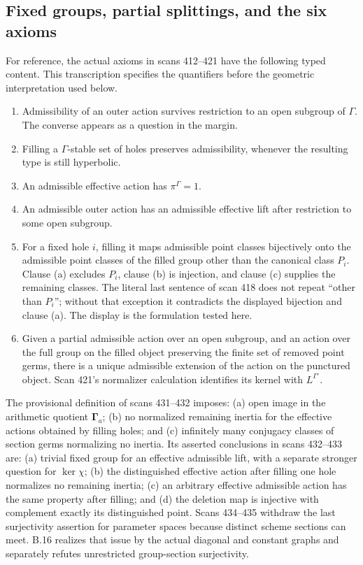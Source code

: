 \subsection{Fixed groups, partial splittings, and the six axioms}

For reference, the actual axioms in scans 412--421 have the following
typed content.  This transcription specifies the quantifiers before
the geometric interpretation used below.
\begin{enumerate}
\item Admissibility of an outer action survives restriction to an open
subgroup of $\Gamma$.  The converse appears as a question in the margin.
\item Filling a $\Gamma$-stable set of holes preserves admissibility,
whenever the resulting type is still hyperbolic.
\item An admissible effective action has $\pi^\Gamma=1$.
\item An admissible outer action has an admissible effective lift
after restriction to some open subgroup.
\item For a fixed hole $i$, filling it maps admissible point classes
bijectively onto the admissible point classes of the filled group
other than the canonical class $P_i$.  Clause (a) excludes $P_i$,
clause (b) is injection, and clause (c) supplies the remaining classes.
The literal last sentence of scan 418 does not repeat ``other than
$P_i$''; without that exception it contradicts the displayed bijection
and clause (a).  The display is the formulation tested here.
\item Given a partial admissible action over an open subgroup,
and an action over the full group on the filled object preserving
the finite set of removed point germs, there is a unique admissible
extension of the action on the punctured object.  Scan 421's
normalizer calculation identifies its kernel with $L^{\Gamma'}$.
\end{enumerate}
The provisional definition of scans 431--432 imposes: (a) open image
in the arithmetic quotient $\boldsymbol\Gamma_a$; (b) no normalized
remaining inertia for the effective actions obtained by filling holes;
and (c) infinitely many conjugacy classes of section germs normalizing
no inertia.  Its asserted conclusions in scans 432--433 are:
(a) trivial fixed group for an effective admissible lift, with a
separate stronger question for $\ker\chi$; (b) the distinguished
effective action after filling one hole normalizes no remaining
inertia; (c) an arbitrary effective admissible action has the same
property after filling; and (d) the deletion map is injective with
complement exactly its distinguished point.  Scans 434--435 withdraw
the last surjectivity assertion for parameter spaces because distinct
scheme sections can meet.  B.16 realizes that issue by the actual
diagonal and constant graphs and separately refutes unrestricted
group-section surjectivity.

